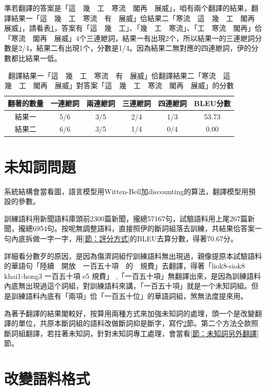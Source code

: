 \documentclass[final,oneside,onecolumn,12pt,a4paper]{book}%
\begin{document}
準若翻譯的答案是「這　幾　工　寒流　閣再　展威」，咱有兩个翻譯的結果，翻譯結果一「這　幾　工　寒流　有　展威」佮結果二「寒流　這　幾　工　閣再　展威」，請看表\ref{表：範例BLEU分數}，答案有「這　幾　工」、「幾　工　寒流」、「工　寒流　閣再」佮「寒流　閣再　展威」4个三連紲詞，結果一有出現2个，所以結果一的三連紲詞分數是2/4，結果二有出現1个，分數是1/4。因為結果二無對應的四連紲詞，伊的分數都比結果一低。

\begin{table}
\caption{翻譯結果一「這　幾　工　寒流　有　展威」佮翻譯結果二「寒流　這　幾　工　閣再　展威」對答案「這　幾　工　寒流　閣再　展威」的分數}%
\label{表：範例BLEU分數}
\centering
\begin{tabular}{|c|cccc|c|}
\hline
翻著的數量 & 一連紲詞 & 兩連紲詞 & 三連紲詞 & 四連紲詞 & BLEU分數\\
\hline
結果一 & 5/6 & 3/5 & 2/4 & 1/3 & 53.73\\
\hline
結果二 & 6/6 & 3/5 & 1/4 & 0/4 & 0.00\\
\hline
\end{tabular}
\end{table}


\section{未知詞問題}
\label{節：未知詞問題}
系統結構會當看圖，語言模型用Witten-Bell加discounting的算法，翻譯模型用預設的參數。

訓練語料用新聞語料庫頭前2300篇新聞，攏總57167句，試驗語料用上尾267篇新聞，攏總6954句。按呢無調整語料，直接照伊的斷詞組落去訓練，共結果佮答案一句內底拆做一字一字，用\ref{節：評分方式}的BLEU去算分數，得著70.67分。

詳細看分數歹的原因，是因為傷濟詞組佇訓練語料無出現過，親像提原本試驗語料的華語句「陸續　開放　一百五十項　的　規費」去翻譯，得著「liok8-siok8 khai1-hong3 一百五十項 e5 規費」 ,「一百五十項」無翻譯出來，是因為訓練語料內底無出現過這个詞組，對訓練語料來講，「一百五十項」就是一个未知詞組。但是訓練語料內底有「兩項」佮「一百五十位」的華語詞組，煞無法度提來用。

為著予翻譯的結果閣較好，按算用兩種方式來加強未知詞的處理，頭一个是改變翻譯的單位，共原本斷詞組的語料改做斷詞抑是斷字，寫佇\ref{節：改變語料格式}節。第二个方法仝款照斷詞組翻譯，若拄著未知詞，針對未知詞專工處理，會當看\ref{節：未知詞另外翻譯}節。



\section{改變語料格式}
\label{節：改變語料格式}
\end{document}
